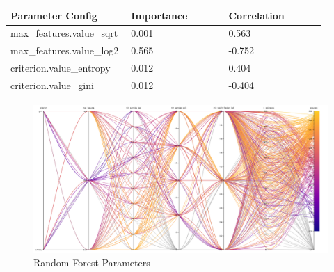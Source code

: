 \documentclass[11pt]{article}
\begin{document}
  \begin{table}[ht]
    \centering
    \begin{tabular}{|p{0.3\linewidth} | p{0.3\linewidth}| p{0.3\linewidth}|} 
      \hline
      \textbf{Parameter Config}  & \textbf{Importance} & \textbf{Correlation} \\ \hline
      max\_features.value\_sqrt & 0.001 & 0.563 \\ \hline
      max\_features.value\_log2 & 0.565 & -0.752 \\ \hline
      criterion.value\_entropy & 0.012 & 0.404 \\ \hline
      criterion.value\_gini & 0.012 & -0.404 \\ \hline
    \end{tabular}
  \end{table}\label{RF_ParamImp2}

\begin{figure}[h]
    \caption {Random Forest Parameters} \label{ParallelCoordRF}
    \centering 
    \includegraphics[width = \textwidth, height = \textwidth, keepaspectratio]{Images/RF ParallelCoordGraph.png}
\end{figure}


  
  \FloatBarrier
\newpage
\end{document}
